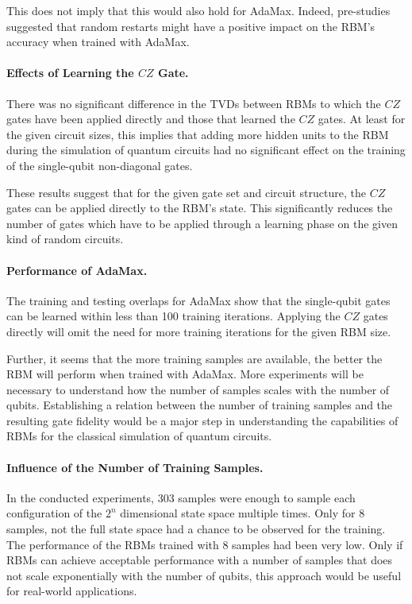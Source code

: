 This does not imply that this would also 
hold for AdaMax. Indeed, pre-studies suggested that random restarts might have a positive 
impact on the RBM's accuracy when trained with AdaMax.

\paragraph{Effects of Learning the $CZ$ Gate.}
There was no significant difference in the TVDs between RBMs to which the $CZ$ gates have 
been applied directly and those that learned the $CZ$ gates. At least for the given circuit 
sizes, this implies that adding more hidden units to the RBM during the simulation of 
quantum circuits had no significant effect on the training of the single-qubit non-diagonal 
gates. 

These results suggest that for the given gate set and circuit structure, the $CZ$ gates can 
be applied directly to the RBM's state. This significantly reduces the number of gates which 
have to be applied through a learning phase on the given kind of random circuits.

\paragraph{Performance of AdaMax.}
The training and testing overlaps for AdaMax show that the single-qubit gates can 
be learned within less than 100 training iterations. Applying 
the $CZ$ gates directly will omit the need for more training iterations for the given RBM size.

Further, it seems that the more training samples are available, the better the RBM will 
perform when trained with AdaMax. More experiments will be necessary 
to understand how the number of samples scales with the number of qubits. Establishing
a relation between the number of training samples and the resulting gate fidelity would 
be a major step in understanding the capabilities of RBMs for the classical simulation of 
quantum circuits.

\paragraph{Influence of the Number of Training Samples.}
In the conducted experiments, 303 samples were enough to sample each configuration of the 
$2^n$ dimensional state space multiple times. Only for 8  samples, not the full state space
had a chance to be observed for the training. The performance of the RBMs trained with 8 samples
had been very low. Only if RBMs can achieve acceptable performance with a number of samples 
that does not scale exponentially with the number of qubits, this approach would be useful for 
real-world applications. 

